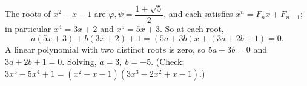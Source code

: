 The roots of $x^2-x-1$ are $\varphi,\psi=\dfrac{1\pm\sqrt5}2$, and each satisfies $x^n=F_nx+F_{n-1}$; in particular $x^4=3x+2$ and $x^5=5x+3$. So at each root,
\[a(5x+3)+b(3x+2)+1=(5a+3b)x+(3a+2b+1)=0.\]
A linear polynomial with two distinct roots is zero, so $5a+3b=0$ and $3a+2b+1=0$. Solving, $\boxed{a=3,\ b=-5}$. (Check: $3x^5-5x^4+1=(x^2-x-1)(3x^3-2x^2+x-1)$.)
